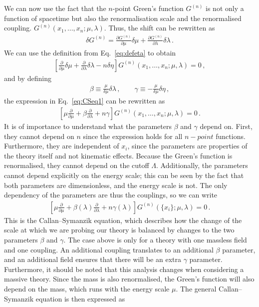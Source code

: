 We can now use the fact that the $n$-point Green's function $G^{(n)}$ is not only a function of spacetime but also the renormalisation scale and the renormalised coupling. $G^{(n)}(x_1,\dots,x_n;\mu,\lambda)$. Thus, the shift can be rewritten as
\begin{align}
    \delta G^{(n)} = \frac{\partial G^{(n)}}{\partial \mu} \delta \mu + \frac{\partial G^{(n)}}{\partial \lambda} \delta \lambda\,.
\end{align}
We can use the definition from Eq.~\eqref{eq:defeta} to obtain 
\begin{align}
     \left[\frac{\partial}{\partial \mu} \delta \mu + \frac{\partial}{\partial \lambda} \delta \lambda- n\delta\eta \right]G^{(n)}(x_1,\dots,x_n;\mu,\lambda)=0\,,\label{eq:CSeq1}
\end{align}
and by defining 
\begin{align}
    \beta\equiv \frac{\mu}{\delta\mu}\delta\lambda\,, \qquad  \gamma\equiv- \frac{\mu}{\delta\mu}\delta\eta\,,\label{eq:beta0}
\end{align}
the expression in Eq.~\eqref{eq:CSeq1} can be rewritten as 
\begin{align}
     \left[\mu\frac{\partial}{\partial \mu}  + \beta \frac{\partial}{\partial \lambda} + n\gamma \right]G^{(n)}(x_1,\dots,x_n;\mu,\lambda)=0\,.
\end{align}
It is of importance to understand what the parameters $\beta$ and $\gamma$ depend on. First, they cannot depend on $n$ since the expression holds for all $n-point$ functions. Furthermore, they are independent of $x_i$, since the parameters are properties of the theory itself and not kinematic effects. Because the Green's function is renormalised, they cannot depend on the cutoff $\Lambda$. Additionally, the parameters cannot depend explicitly on the energy scale; this can be seen by the fact that both parameters are dimensionless, and the energy scale is not. The only dependency of the parameters are thus the couplings, so we can write 
\begin{align}
     \left[\mu\frac{\partial}{\partial \mu}  + \beta(\lambda) \frac{\partial}{\partial \lambda} + n\gamma(\lambda) \right]G^{(n)}(\{x_i\};\mu,\lambda)=0\,.
\end{align}
This is the Callan--Symanzik equation, which describes how the change of the scale at which we are probing our theory is balanced by changes to the two parameters $\beta$ and $\gamma$. The case above is only for a theory with one massless field and one coupling. An additional coupling translates to an additional $\beta$ parameter, and an additional field ensures that there will be an extra $\gamma$ parameter. Furthermore, it should be noted that this analysis changes when considering a massive theory. Since the mass is also renormalised, the Green's function will also depend on the mass, which runs with the energy scale $\mu$. The general Callan--Symanzik equation is then expressed as \cite{Srednicki2007}
